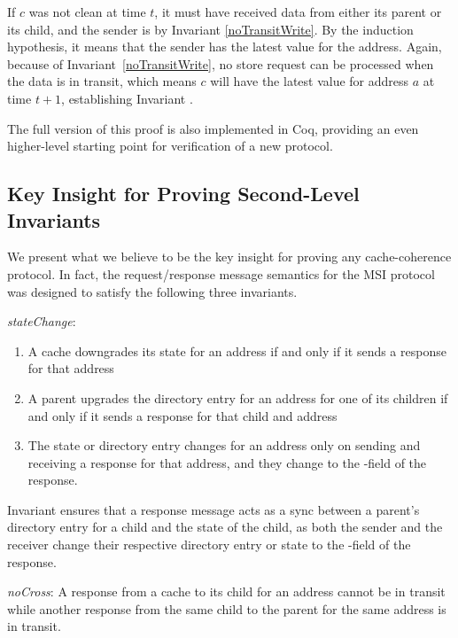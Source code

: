 If $c$ was not clean at time $t$, it must have received data from either its
parent or its child, and the sender is \clean{} by Invariant
\ref{noTransitWrite}. By the induction hypothesis, it means that the sender has
the latest value for the address. Again, because of
Invariant~\ref{noTransitWrite}, no store request can be processed when the data
is in transit, which means $c$ will have the latest value for address $a$ at
time $t+1$, establishing Invariant .

The full version of this proof is also implemented in Coq, providing an even
higher-level starting point for verification of a new protocol.

\subsection{Key Insight for Proving Second-Level Invariants}

We present what we believe to be the key insight for proving any cache-coherence protocol.
In fact, the request/response message semantics for the MSI protocol was designed to satisfy
the following three invariants.

\begin{inv}
\textit{stateChange}:
\begin{enumerate}
\item A cache downgrades its state for an address if and only if it sends a response for that address
\item A parent upgrades the directory entry for an address for one of
  its children if and only if it sends a response for that child and
  address
\item The state or directory entry changes for an address only on sending and
receiving a response for that address, and they change to the \myto-field of the response.
\end{enumerate}
\label{stateChange}
\end{inv}
\vspace{-.1in}

Invariant  ensures that a response message acts as a sync
between a parent's directory entry for a child and the state of the child, as
both the sender and the receiver change their respective directory entry or
state to the \myto-field of the response.

\begin{inv}
\textit{noCross}: A response from a cache to its child for an address cannot
be in transit while another response from the same child to the parent for the
same address is in transit.
\label{noCross}
\end{inv}

